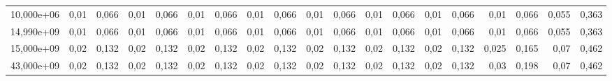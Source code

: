 \begin{longtable}{rrrrrrrrrrrrrrrrrrr}
\hline
\endhead
10,000e+06 & 0,01 & 0,066 & 0,01 & 0,066 & 0,01 & 0,066 & 0,01 & 0,066 & 0,01 & 0,066 & 0,01 & 0,066 & 0,01 & 0,066 & 0,01 & 0,066 & 0,055 & 0,363\\
14,990e+09 & 0,01 & 0,066 & 0,01 & 0,066 & 0,01 & 0,066 & 0,01 & 0,066 & 0,01 & 0,066 & 0,01 & 0,066 & 0,01 & 0,066 & 0,01 & 0,066 & 0,055 & 0,363\\
15,000e+09 & 0,02 & 0,132 & 0,02 & 0,132 & 0,02 & 0,132 & 0,02 & 0,132 & 0,02 & 0,132 & 0,02 & 0,132 & 0,02 & 0,132 & 0,025 & 0,165 & 0,07 & 0,462\\
43,000e+09 & 0,02 & 0,132 & 0,02 & 0,132 & 0,02 & 0,132 & 0,02 & 0,132 & 0,02 & 0,132 & 0,02 & 0,132 & 0,02 & 0,132 & 0,03 & 0,198 & 0,07 & 0,462\\
\end{longtable}
